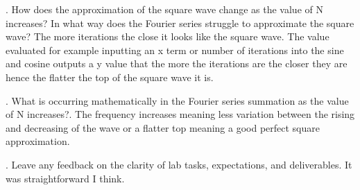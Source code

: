 \documentclass[12pt,a4paper]{article}
\begin{document}
. How does the approximation of the square wave change as the value of N increases? In what
way does the Fourier series struggle to approximate the square wave?\newline
\noindent The more iterations the close it looks like the square wave. The value evaluated for example inputting an x term or number of iterations into the sine and cosine outputs a y value that the more the iterations are the closer they are hence the flatter the top of the square wave it is.

. What is occurring mathematically in the Fourier series summation as the value of N increases?. \newline
\noindent The frequency increases meaning less variation between the rising and decreasing of the wave or a flatter top meaning a good perfect square approximation.

. Leave any feedback on the clarity of lab tasks, expectations, and deliverables. \newline
It was straightforward I think.






\end{document}
